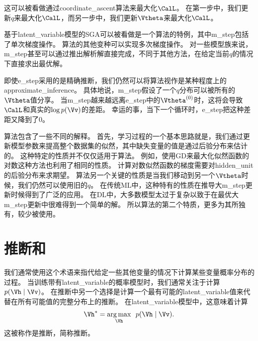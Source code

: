 这可以被看做通过\gls{coordinate_ascent}算法来最大化$\CalL$。
在第一步中，我们更新$q$来最大化$\CalL$，而另一步中，我们更新$\Vtheta$来最大化$\CalL$。


基于\gls{latent_variable}模型的\gls{SGA}可以被看做是一个算法的特例，其中\gls{m_step}包括了单次梯度操作。
算法的其他变种可以实现多次梯度操作。
对一些模型族来说，\gls{m_step}甚至可以通过推出解析解直接完成，不同于其他方法，在给定当前$q$的情况下直接求出最优解。


即使\gls{e_step}采用的是精确推断，我们仍然可以将算法视作是某种程度上的\gls{approximate_inference}。
具体地说，\gls{m_step}假设了一个$q$分布可以被所有的$\Vtheta$值分享。
当\gls{m_step}越来越远离\gls{e_step}中的$\Vtheta^{(0)}$时，这将会导致$\CalL$和真实的$\log p(\Vv)$的差距。
幸运的事，当下一个循环时，\gls{e_step}把这种差距又降到了$0$。



算法包含了一些不同的解释。
首先，学习过程的一个基本思路就是，我们通过更新模型参数来提高整个数据集的似然，其中缺失变量的值是通过后验分布来估计的。
这种特定的性质并不仅仅适用于算法。
例如，使用\gls{GD}来最大化似然函数的对数这种方法也利用了相同的性质。
计算对数似然函数的梯度需要对\gls{hidden_unit}的后验分布来求期望。 
算法另一个关键的性质是当我们移动到另一个$\Vtheta$时候，我们仍然可以使用旧的$q$。
在传统\gls{ML}中，这种特有的性质在推导大\gls{m_step}更新时候得到了广泛的应用。
在\gls{DL}中，大多数模型太过于复杂以致于在最优大\gls{m_step}更新中很难得到一个简单的解。
所以算法的第二个特质，更多为其所独有，较少被使用。


\section{推断和}
\label{sec:map_inference_and_sparse_coding}


我们通常使用这个术语来指代给定一些其他变量的情况下计算某些变量概率分布的过程。
当训练带有\gls{latent_variable}的概率模型时，我们通常关注于计算$p(\Vh\mid\Vv)$。
在推断中另一个选择是计算一个最有可能的\gls{latent_variable}值来代替在所有可能值的完整分布上的推断。
在\gls{latent_variable}模型中，这意味着计算
\begin{align}
\Vh^* = \underset{\Vh}{\arg\max} \ \  p(\Vh\mid\Vv).
\end{align}
这被称作是推断，简称推断。



